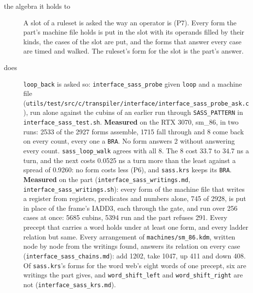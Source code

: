 \begin{description}
\item[{the algebra it holds to}] A slot of a ruleset is asked the way an operator is (P7). Every form the part's machine file holds is put in the slot with its operands filled by their kinds, the cases of the slot are put, and the forms that answer every case are timed and walked. The ruleset's form for the slot is the part's answer.
\item[{does}] \texttt{loop\_\allowbreak{}back} is asked so: \texttt{interface\_\allowbreak{}sass\_\allowbreak{}probe} given \texttt{loop} and a machine file (\texttt{utils/\allowbreak{}test/\allowbreak{}src/\allowbreak{}c/\allowbreak{}transpiler/\allowbreak{}interface/\allowbreak{}interface\_\allowbreak{}sass\_\allowbreak{}probe\_\allowbreak{}ask.\allowbreak{}c}), run alone against the cubins of an earlier run through \texttt{SASS\_\allowbreak{}PATTERN} in \texttt{interface\_\allowbreak{}sass\_\allowbreak{}test.\allowbreak{}sh}. \textbf{Measured} on the RTX 3070, sm\_\allowbreak{}86, in two runs: 2533 of the 2927 forms assemble, 1715 fall through and 8 come back on every count, every one a \texttt{BRA}. No form answers 2 without answering every count. \texttt{sass\_\allowbreak{}loop\_\allowbreak{}walk} agrees with all 8. The 8 cost 33.7 to 34.7 ns a turn, and the next costs 0.0525 ns a turn more than the least against a spread of 0.9260: no form costs less (P6), and \texttt{sass.\allowbreak{}krs} keeps its \texttt{BRA}. \textbf{Measured} on the part (\texttt{interface\_\allowbreak{}sass\_\allowbreak{}writings.\allowbreak{}md}, \texttt{interface\_\allowbreak{}sass\_\allowbreak{}writings.\allowbreak{}sh}): every form of the machine file that writes a register from registers, predicates and numbers alone, 745 of 2928, is put in place of the frame's IADD3, each through the gate, and run over 256 cases at once: 5685 cubins, 5394 run and the part refuses 291. Every precept that carries a word holds under at least one form, and every ladder relation but same. Every arrangement of \texttt{machines/\allowbreak{}sm\_\allowbreak{}86.\allowbreak{}kdm}, written node by node from the writings found, answers its relation on every case (\texttt{interface\_\allowbreak{}sass\_\allowbreak{}chains.\allowbreak{}md}): add 1202, take 1047, up 411 and down 408. Of \texttt{sass.\allowbreak{}krs}'s forms for the word web's eight words of one precept, six are writings the part gives, and \texttt{word\_\allowbreak{}shift\_\allowbreak{}left} and \texttt{word\_\allowbreak{}shift\_\allowbreak{}right} are not (\texttt{interface\_\allowbreak{}sass\_\allowbreak{}krs.\allowbreak{}md}).

\end{description}
